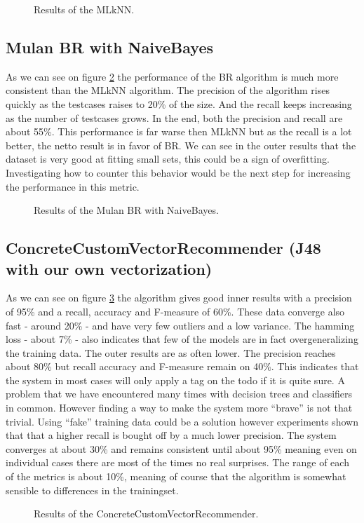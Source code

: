 \documentclass[a4paper,titlepage]{article}
\begin{document}
\begin{figure}
\centering
{}
\caption{Results of the MLkNN.}
\label{fig:mlknnr}
\end{figure}

\subsection{Mulan BR with NaiveBayes}
As  we can see on figure \ref{fig:br} the performance of the BR algorithm is much more consistent than the MLkNN algorithm. The precision of the algorithm rises quickly as the testcases raises to 20\% of the size. And the recall keeps increasing as the number of testcases grows. In the end, both the precision and recall are about 55\%. This performance is far warse then MLkNN but as the recall is a lot better, the netto result is in favor of BR. We can see in the outer results that the dataset is very good at fitting small sets, this could be a sign of overfitting. Investigating how to counter this behavior would be the next step for increasing the performance in this metric.

\begin{figure}
\centering
{}
\caption{Results of the Mulan BR with NaiveBayes.}
\label{fig:br}
\end{figure}

\subsection{ConcreteCustomVectorRecommender (J48 with our own vectorization)}
As we can see on figure \ref{fig:ccvrresults} the algorithm gives good inner results with a precision of 95\% and a recall, accuracy and F-measure of 60\%. These data converge also fast - around 20\% - and have very few outliers and a low variance. The hamming loss - about 7\% - also indicates that few of the models are in fact overgeneralizing the training data. The outer results are as often lower. The precision reaches about 80\% but recall accuracy and F-measure remain on 40\%. This indicates that the system in most cases will only apply a tag on the todo if it is quite sure. A problem that we have encountered many times with decision trees and classifiers in common. However finding a way to make the system more ``brave'' is not that trivial. Using ``fake'' training data could be a solution however experiments shown that that a higher recall is bought off by a much lower precision. The system converges at about 30\% and remains consistent until about 95\% meaning even on individual cases there are most of the times no real surprises. The range of each of the metrics is about 10\%, meaning of course that the algorithm is somewhat sensible to differences in the trainingset.
\begin{figure}
\centering
{}
\caption{Results of the ConcreteCustomVectorRecommender.}
\label{fig:ccvrresults}
\end{figure}
\end{document}
